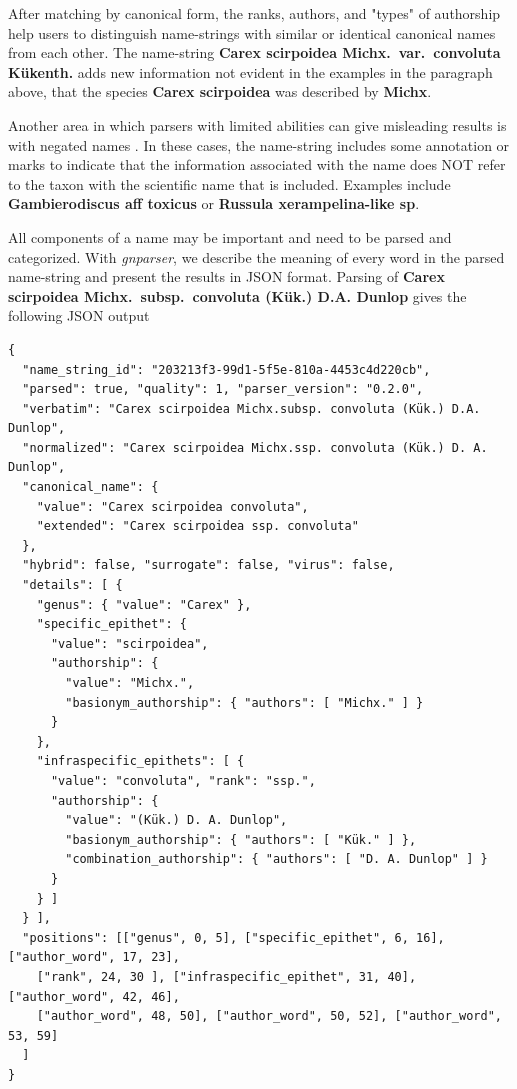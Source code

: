 \documentclass{bmcart}
\begin{document}
After matching by canonical form, the ranks, authors, and "types" of authorship
help users to distinguish name-strings with similar or identical canonical
names from each other.  The name-string \textbf{Carex scirpoidea Michx.\ var.\
  convoluta Kükenth.} adds new information not evident in the examples in the
paragraph above, that the species \textbf{Carex scirpoidea} was described by
\textbf{Michx}.

Another area in which parsers with limited abilities can give misleading
results is with negated names \cite{Patterson2016}. In these cases, the
name-string includes some annotation or marks to indicate that the information
associated with the name does NOT refer to the taxon with the scientific name
that is included. Examples include \textbf{Gambierodiscus aff toxicus} or
\textbf{Russula xerampelina-like sp}.

All components of a name may be important and need to be parsed and
categorized. With \textit{gnparser}, we describe the meaning of every word in
the parsed name-string and present the results in JSON format. Parsing of
\textbf{Carex scirpoidea Michx.\  subsp.\ convoluta (Kük.) D.A. Dunlop} gives
the following JSON output \vspace{0.5cm}

\begin{Verbatim}[fontsize=\scriptsize]
{
  "name_string_id": "203213f3-99d1-5f5e-810a-4453c4d220cb",
  "parsed": true, "quality": 1, "parser_version": "0.2.0",
  "verbatim": "Carex scirpoidea Michx.subsp. convoluta (Kük.) D.A. Dunlop",
  "normalized": "Carex scirpoidea Michx.ssp. convoluta (Kük.) D. A. Dunlop",
  "canonical_name": {
    "value": "Carex scirpoidea convoluta",
    "extended": "Carex scirpoidea ssp. convoluta"
  },
  "hybrid": false, "surrogate": false, "virus": false,
  "details": [ {
    "genus": { "value": "Carex" },
    "specific_epithet": {
      "value": "scirpoidea",
      "authorship": {
        "value": "Michx.",
        "basionym_authorship": { "authors": [ "Michx." ] }
      }
    },
    "infraspecific_epithets": [ {
      "value": "convoluta", "rank": "ssp.",
      "authorship": {
        "value": "(Kük.) D. A. Dunlop",
        "basionym_authorship": { "authors": [ "Kük." ] },
        "combination_authorship": { "authors": [ "D. A. Dunlop" ] }
      }
    } ]
  } ],
  "positions": [["genus", 0, 5], ["specific_epithet", 6, 16], ["author_word", 17, 23],
    ["rank", 24, 30 ], ["infraspecific_epithet", 31, 40], ["author_word", 42, 46],
    ["author_word", 48, 50], ["author_word", 50, 52], ["author_word", 53, 59]
  ]
}
\end{Verbatim}
\end{document}
